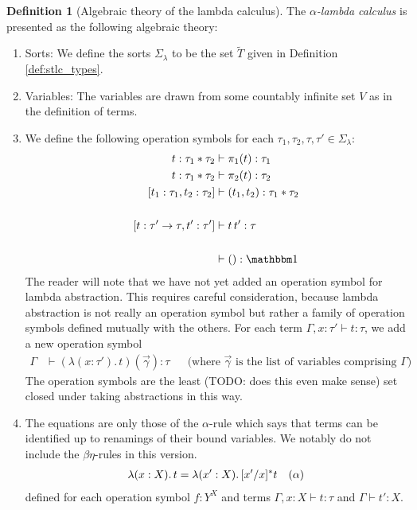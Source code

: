 \documentclass[12pt,twoside]{reedthesis}
\theoremstyle{definition}
\newtheorem{definition}{Definition}
\theoremstyle{remark}
\theoremstyle{plain}
\begin{document}
\begin{definition}[Algebraic theory of the lambda calculus]
  The \emph{$\alpha$-lambda calculus} is presented as the following algebraic theory:
  \begin{enumerate}
    \item Sorts: We define the sorts \( \Sigma_{\lambda}\) to be the set
    \( \widetilde{T} \) given in Definition \ref{def:stlc_types}.
    \item Variables: The variables are drawn from some countably infinite set
          $V$ as in the definition of terms.
    \item We define the following operation symbols for each
          \(\tau_{1},\tau_{2},\tau,\tau' \in \Sigma_{\lambda}\):
          \begin{align*}
            t : \tau_{1} * \tau_{2} &\vdash \pi_{1}(t) : \tau_{1} \\
            t : \tau_{1} * \tau_{2} &\vdash \pi_{2}(t) : \tau_{2} \\
            [t_{1} : \tau_{1}, t_{2} : \tau_{2}] &\vdash (t_{1},t_{2}) : \tau_{1} * \tau_{2} \\
            \\
            [t : \tau' \rightarrow \tau , t' : \tau'] &\vdash t\, t' : \tau \\\\
            &\vdash () : \termob\\
          \end{align*}
          The reader will note that we have not yet added an operation symbol
          for lambda abstraction. This requires careful consideration, because
          lambda abstraction is not really an operation symbol but rather a
          family of operation symbols defined mutually with the others. For each
          term \( \Gamma, x:\tau' \vdash t : \tau \), we add a new operation symbol
         \begin{align*}
           \Gamma &\vdash (\lambda (x:\tau').\, t)(\overrightarrow{\gamma}) : \tau && \text{(where $\overrightarrow{\gamma}$ is the list of variables comprising $\Gamma$)}
         \end{align*}
          The operation symbols are the least (TODO: does this even make sense)
          set closed under taking abstractions in this way.
    \item The equations are only those of the $\alpha$-rule which says that terms can
          be identified up to renamings of their bound variables. We notably do
          not include the $\beta\eta$-rules in this version.
          \begin{align*}
            \lambda (x:X).\, t = \lambda (x':X).\, [x'/x]^{*} t && (\alpha)
          \end{align*}
          defined for each operation symbol \( f : Y^{X}\) and terms
          \( \Gamma, x : X \vdash t : \tau \) and \( \Gamma \vdash t' : X\).
  \end{enumerate}
\end{definition}
\end{document}
